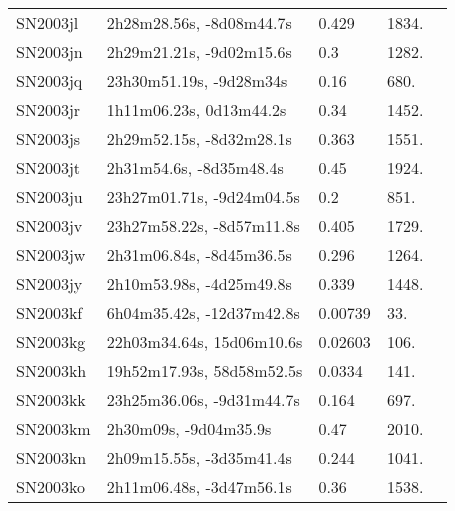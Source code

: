 \begin{longtable}{lllll}
         SN2003jl &       2h28m28.56s, -8d08m44.7s &    0.429 &          1834. &    \citet{2006AJ....131.1648B} \\
         SN2003jn &       2h29m21.21s, -9d02m15.6s &      0.3 &          1282. &    \citet{2003IAUC.8237B...1C} \\
         SN2003jq &        23h30m51.19s, -9d28m34s &     0.16 &           680. &    \citet{2006AJ....131.1648B} \\
         SN2003jr &        1h11m06.23s, 0d13m44.2s &     0.34 &          1452. &    \citet{2006AJ....131.1648B} \\
         SN2003js &       2h29m52.15s, -8d32m28.1s &    0.363 &          1551. &    \citet{2006AJ....131.1648B} \\
         SN2003jt &        2h31m54.6s, -8d35m48.4s &     0.45 &          1924. &    \citet{2006AJ....131.1648B} \\
         SN2003ju &      23h27m01.71s, -9d24m04.5s &      0.2 &           851. &    \citet{2006AJ....131.1648B} \\
         SN2003jv &      23h27m58.22s, -8d57m11.8s &    0.405 &          1729. &    \citet{2006AJ....131.1648B} \\
         SN2003jw &       2h31m06.84s, -8d45m36.5s &    0.296 &          1264. &    \citet{2006AJ....131.1648B} \\
         SN2003jy &       2h10m53.98s, -4d25m49.8s &    0.339 &          1448. &    \citet{2006AJ....131.1648B} \\
         SN2003kf &      6h04m35.42s, -12d37m42.8s &  0.00739 &            33. &  \citet{1998AandAS..130..333T} \\
         SN2003kg &      22h03m34.64s, 15d06m10.6s &  0.02603 &           106. &    \citet{1999ApJS..121..287H} \\
         SN2003kh &      19h52m17.93s, 58d58m52.5s &   0.0334 &           141. &    \citet{2003IAUC.8246B...1F} \\
         SN2003kk &      23h25m36.06s, -9d31m44.7s &    0.164 &           697. &    \citet{2006AJ....131.1648B} \\
         SN2003km &          2h30m09s, -9d04m35.9s &     0.47 &          2010. &    \citet{2006AJ....131.1648B} \\
         SN2003kn &       2h09m15.55s, -3d35m41.4s &    0.244 &          1041. &    \citet{2006AJ....131.1648B} \\
         SN2003ko &       2h11m06.48s, -3d47m56.1s &     0.36 &          1538. &    \citet{2006AJ....131.1648B} \\

\end{longtable}
